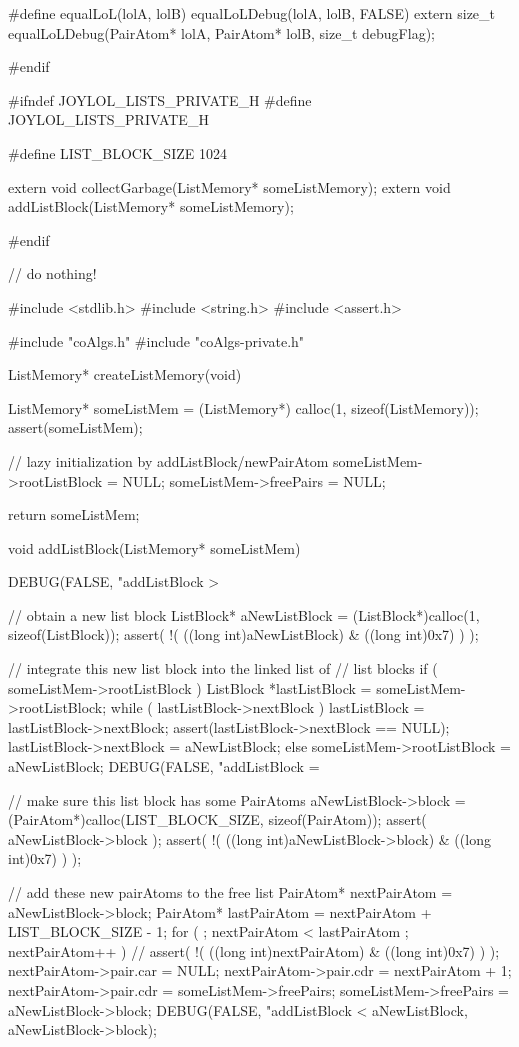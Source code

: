 #define equalLoL(lolA, lolB) equalLoLDebug(lolA, lolB, FALSE)
extern size_t equalLoLDebug(PairAtom* lolA, PairAtom* lolB, size_t debugFlag);

#endif
\stopCHeader

\startCHeader
#ifndef JOYLOL_LISTS_PRIVATE_H
#define JOYLOL_LISTS_PRIVATE_H

#define LIST_BLOCK_SIZE 1024

extern void collectGarbage(ListMemory* someListMemory);
extern void addListBlock(ListMemory* someListMemory);

#endif
\stopCHeader

\startCCode
// do nothing!
\stopCCode

\startCCode
#include <stdlib.h>
#include <string.h>
#include <assert.h>

#include "coAlgs.h"
#include "coAlgs-private.h"

ListMemory* createListMemory(void) {
  ListMemory* someListMem = (ListMemory*) calloc(1, sizeof(ListMemory));
  assert(someListMem);

  // lazy initialization by addListBlock/newPairAtom
  someListMem->rootListBlock = NULL;
  someListMem->freePairs     = NULL;

  return someListMem;
}

void addListBlock(ListMemory* someListMem) {
  DEBUG(FALSE, "addListBlock > %

  // obtain a new list block
  ListBlock* aNewListBlock = (ListBlock*)calloc(1, sizeof(ListBlock));
  assert( !( ((long int)aNewListBlock) & ((long int)0x7) ) );

  // integrate this new list block into the linked list of
  // list blocks
  if ( someListMem->rootListBlock ) {
    ListBlock *lastListBlock = someListMem->rootListBlock;
    while ( lastListBlock->nextBlock ) {
      lastListBlock = lastListBlock->nextBlock;
    }
    assert(lastListBlock->nextBlock == NULL);
    lastListBlock->nextBlock = aNewListBlock;
  } else {
    someListMem->rootListBlock = aNewListBlock;
  }
  DEBUG(FALSE, "addListBlock = %

  // make sure this list block has some PairAtoms
  aNewListBlock->block = (PairAtom*)calloc(LIST_BLOCK_SIZE, sizeof(PairAtom));
  assert( aNewListBlock->block );
  assert( !( ((long int)aNewListBlock->block) & ((long int)0x7) ) );

  // add these new pairAtoms to the free list
  PairAtom* nextPairAtom = aNewListBlock->block;
  PairAtom* lastPairAtom = nextPairAtom + LIST_BLOCK_SIZE - 1;
  for ( ; nextPairAtom < lastPairAtom ; nextPairAtom++ ) {
//    assert( !( ((long int)nextPairAtom) & ((long int)0x7) ) );
    nextPairAtom->pair.car = NULL;
    nextPairAtom->pair.cdr = nextPairAtom + 1;
  }
  nextPairAtom->pair.cdr = someListMem->freePairs;
  someListMem->freePairs = aNewListBlock->block;
  DEBUG(FALSE, "addListBlock < %
        aNewListBlock, aNewListBlock->block);
}

